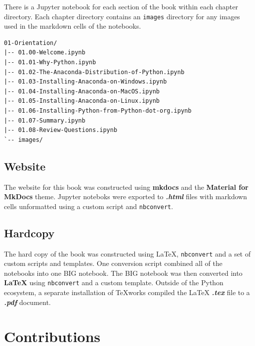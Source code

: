 \documentclass{book}
\begin{document}
There is a Jupyter notebook for each section of the book within each
chapter directory. Each chapter directory contains an \lstinline!images!
directory for any images used in the markdown cells of the notebooks.

\begin{lstlisting}
01-Orientation/
|-- 01.00-Welcome.ipynb
|-- 01.01-Why-Python.ipynb
|-- 01.02-The-Anaconda-Distribution-of-Python.ipynb
|-- 01.03-Installing-Anaconda-on-Windows.ipynb
|-- 01.04-Installing-Anaconda-on-MacOS.ipynb
|-- 01.05-Installing-Anaconda-on-Linux.ipynb
|-- 01.06-Installing-Python-from-Python-dot-org.ipynb
|-- 01.07-Summary.ipynb
|-- 01.08-Review-Questions.ipynb
`-- images/
\end{lstlisting}
    




    
        \subsection{Website}\label{website}
    




    
        The website for this book was constructed using \textbf{mkdocs} and the
\textbf{Material for MkDocs} theme. Jupyter noteboks were exported to
\textbf{\emph{.html}} files with markdown cells unformatted using a
custom script and \lstinline!nbconvert!.
    




    
        \subsection{Hardcopy}\label{hardcopy}
    




    
        The hard copy of the book was constructed using LaTeX,
\lstinline!nbconvert! and a set of custom scripts and templates. One
conversion script combined all of the notebooks into one BIG notebook.
The BIG notebook was then converted into \textbf{LaTeX} using
\lstinline!nbconvert! and a custom template. Outside of the Python
ecosystem, a separate installation of TeXworks compiled the LaTeX
\textbf{\emph{.tex}} file to a \textbf{\emph{.pdf}} document.
    




    
        \section{Contributions}\label{contributions}
    
\end{document}
